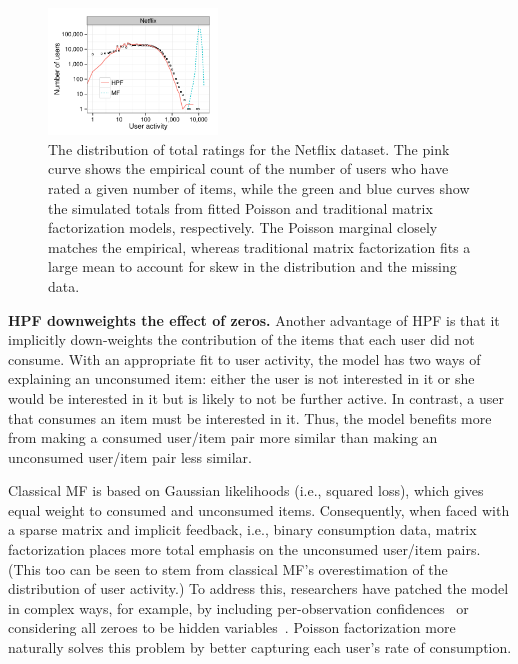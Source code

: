 \begin{figure}[t!]
  \centering
  \includegraphics[width=0.4\textwidth]{figures/user_activity_sim_netflix.pdf}
  \caption{The distribution of total ratings for the Netflix dataset.
    The pink curve shows the empirical count of the number of users
    who have rated a given number of items, while the green and blue
    curves show the simulated totals from fitted Poisson and
    traditional matrix factorization models, respectively. The Poisson
    marginal closely matches the empirical, whereas traditional matrix
    factorization fits a large mean to account for skew in the
    distribution and the missing data.}
\label{fig:marginals}
\end{figure}

{\bf HPF downweights the effect of zeros.}  Another advantage of HPF
is that it implicitly down-weights the contribution of the items that
each user did not consume.  With an appropriate fit to user activity,
the model has two ways of explaining an unconsumed item: either the
user is not interested in it or she would be interested in it but is
likely to not be further active. In contrast, a user that consumes an
item must be interested in it.  Thus, the model benefits more from
making a consumed user/item pair more similar than making an
unconsumed user/item pair less similar.

Classical MF is based on Gaussian likelihoods (i.e., squared loss),
which gives equal weight to consumed and unconsumed items.
Consequently, when faced with a sparse matrix and implicit feedback,
i.e., binary consumption data, matrix factorization places more total
emphasis on the unconsumed user/item pairs.  (This too can be seen to
stem from classical MF's overestimation of the distribution of user
activity.)  To address this, researchers have patched the model in
complex ways, for example, by including per-observation
confidences~\cite{Koren:2009} or considering all zeroes to be hidden
variables~\cite{Paquet:2013p9197}.  Poisson factorization more
naturally solves this problem by better capturing each user's rate of
consumption.


